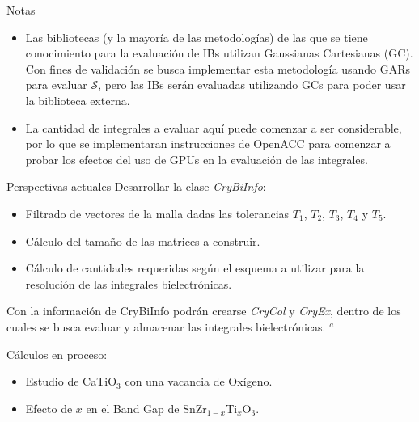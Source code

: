 \documentclass[dvisvgm,11pt,aspectratio=169]{beamer}
\begin{document}
\begin{frame}

\begin{block}{Notas}
\begin{itemize}
\item Las bibliotecas (y la mayoría de las metodologías) de las que se tiene conocimiento para la evaluación de IBs utilizan Gaussianas Cartesianas (GC). Con fines de validación se busca implementar esta metodología usando GARs para evaluar $\bm{\mathcal{S}}$, pero las IBs serán evaluadas utilizando GCs para poder usar la biblioteca externa.
\item La cantidad de integrales a evaluar aquí puede comenzar a ser considerable, por lo que se implementaran instrucciones de OpenACC para comenzar a probar los efectos del uso de GPUs en la evaluación de las integrales.
\end{itemize}
\end{block}
\end{frame} 

\begin{frame}{Perspectivas actuales}
Desarrollar la clase \textit{CryBiInfo}:

\begin{itemize}
    \item Filtrado de vectores de la malla dadas las tolerancias $T_1$, $T_2$, $T_3$, $T_4$ y $T_5$.
    \item Cálculo del tamaño de las matrices a construir.
    \item Cálculo de cantidades requeridas según el esquema a utilizar para la resolución de las integrales bielectrónicas.
\end{itemize}

Con la información de CryBiInfo podrán crearse \textit{CryCol} y \textit{CryEx}, dentro de los cuales se busca evaluar y almacenar las integrales bielectrónicas. $^a$

Cálculos en proceso:
\begin{itemize}
\item Estudio de CaTiO$_3$ con una vacancia de Oxígeno.
\item Efecto de $x$ en el Band Gap de SnZr$_{1-x}$Ti$_x$O$_3$.
\end{itemize}

\end{frame}
\end{document}
